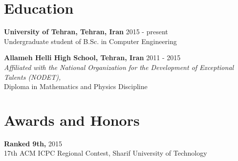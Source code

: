 \documentclass[margin]{res}
\begin{document}
 
 
 
\address{No. 14, Tanhajou Street, \\Tehranpars 3rd Square, \\Tehran, Iran}
\address{Email: shayan.hosseiny@gmail.com \\ Cell: +98-919-6421171 \\ www.shayanh.ir}

 
\begin{resume} 

\vspace{2mm}


\vspace{5mm}


\section{Education}
    {\bf University of Tehran, Tehran, Iran} \hfill 2015 - present
    \\Undergraduate student of B.Sc. in Computer Engineering

    {\bf Allameh Helli High School, Tehran, Iran} \hfill 2011 - 2015
    \\\textit{\scriptsize Affiliated with the National Organization for the Development of Exceptional Talents (NODET),}
    \\Diploma in Mathematics and Physics Discipline

\vspace{5mm}


\section{Awards and Honors}
    {\bf Ranked 9th,} \hfill 2015
    \\17th ACM ICPC Regional Contest, Sharif University of Technology
    

\end{resume}
\end{document}
